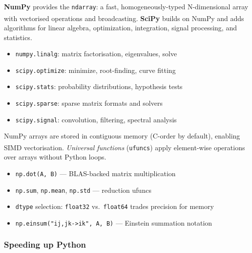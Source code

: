 \begin{tcbitemize}[ skin=sectionraster ]
    \tcbitem[title={NumPy and SciPy}, raster multicolumn=3]
    \textbf{NumPy} provides the \texttt{ndarray}: a fast, homogeneously-typed N-dimensional array with vectorised operations and broadcasting\textsuperscript{\cite{fuhrerScientificComputingPython2021}}.
    \textbf{SciPy} builds on NumPy and adds algorithms for linear algebra, optimization, integration, signal processing, and statistics.
    \tcblower
    \begin{itemize}
        \item \texttt{numpy.linalg}: matrix factorisation, eigenvalues, solve
        \item \texttt{scipy.optimize}: minimize, root-finding, curve fitting
        \item \texttt{scipy.stats}: probability distributions, hypothesis tests
        \item \texttt{scipy.sparse}: sparse matrix formats and solvers
        \item \texttt{scipy.signal}: convolution, filtering, spectral analysis
    \end{itemize}

    \tcbitem[title={Performance: Memory Layout and ufuncs}, raster multicolumn=3]
    NumPy arrays are stored in contiguous memory (C-order by default), enabling SIMD vectorisation\textsuperscript{\cite{fuhrerScientificComputingPython2021}}.
    \emph{Universal functions} (\texttt{ufuncs}) apply element-wise operations over arrays without Python loops.
    \tcblower
    \begin{itemize}
        \item \texttt{np.dot(A, B)} --- BLAS-backed matrix multiplication
        \item \texttt{np.sum}, \texttt{np.mean}, \texttt{np.std} --- reduction ufuncs
        \item \texttt{dtype} selection: \texttt{float32} vs.\ \texttt{float64} trades precision for memory
        \item \texttt{np.einsum("ij,jk->ik", A, B)} --- Einstein summation notation
    \end{itemize}
\end{tcbitemize}

\subsubsection{Speeding up Python}

